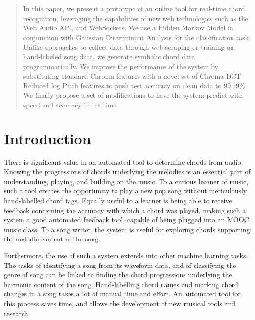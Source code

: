 \documentclass{article}
\begin{document}

\begin{abstract}
In this paper, we present a prototype of an online tool for real-time chord
recognition, leveraging the capabilities of new web technologies such as the Web
Audio API, and WebSockets. We use a Hidden Markov Model in conjunction with
Gaussian Discriminant Analysis for the classification task. Unlike approaches to
collect data through web-scraping or training on hand-labeled song data, we
generate symbolic chord data programmatically. We improve the performance of
the system by substituting standard Chroma features with a novel set of
Chroma DCT-Reduced log Pitch features to push test accuracy on clean data to
99.19\%. We finally propose a set of modifications to have the system predict
with speed and accuracy in realtime.
\end{abstract}

\section{Introduction}
\label{intro}
There is significant value in an automated tool to determine chords from audio.
Knowing the progressions of chords underlying the melodies is an essential part
of understanding, playing, and building on the music. To a curious learner of
music, such a tool creates the opportunity to play a new pop song without
meticulously hand-labelled chord tags. Equally useful to a learner is being able
to receive feedback concerning the accuracy with which a chord was played,
making such a system a good automated feedback tool, capable of being plugged
into an MOOC music class. To a song writer, the system is useful for exploring
chords supporting the melodic content of the song.

Furthermore, the use of such a system extends into other machine learning tasks.
The tasks of identifying a song from its waveform data, and of classifying the
genre of song can be linked to finding the chord progressions underlying the
harmonic content of the song. Hand-labelling chord names and marking chord
changes in a song takes a lot of manual time and effort. An automated tool for
this process saves time, and allows the development of new musical tools and
research.
\end{document}
